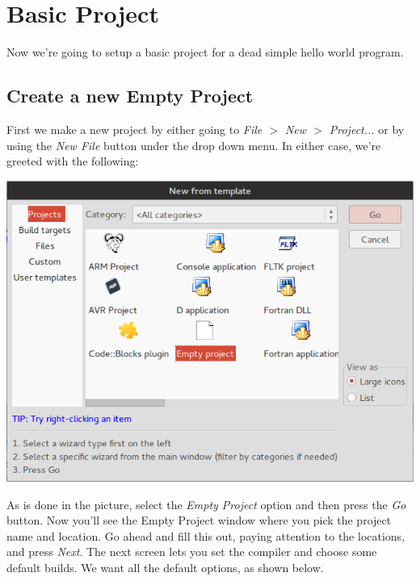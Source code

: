 \documentclass[10pt]{article}
\begin{document}
\section{Basic Project}

Now we're going to setup a basic project for a dead simple hello world program. 

\subsection{Create a new Empty Project}

First we make a new project by either going to \textit{File $>$ New $>$ Project...} or by using the \textit{New File} button under the drop down menu.  In either case, we're greeted with the following:

\vspace{.1in}
\begin{center}
\includegraphics[scale=.5]{CB_NewProject.png}
\end{center}
\vspace{.1in}

As is done in the picture, select the \textit{Empty Project} option and then press the \textit{Go} button. Now you'll see the Empty Project window where you pick the project name and location. Go ahead and fill this out, paying attention to the locations, and press \textit{Next}. The next screen lets you set the compiler and choose some default builds. We want all the default options, as shown below.
\end{document}
